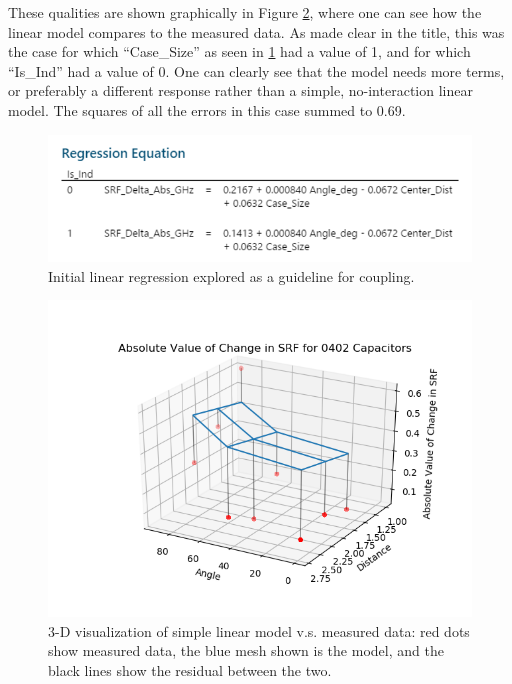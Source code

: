 \documentclass[12pt]{usfcoe}
\begin{document}
    These qualities are shown graphically in Figure \ref{fig:minitab_model_visualization}, where one can see how the linear model compares to the measured data.
    As made clear in the title, this was the case for which ``Case\_Size'' as seen in \ref{fig:minitab_linear_models} had a value of 1, and for which ``Is\_Ind'' had a value of 0. 
    One can clearly see that the model needs more terms, or preferably a different response rather than a simple, no-interaction linear model. 
    The squares of all the errors in this case summed to 0.69.

    \begin{figure}[H]
		\begin{center}
        	\includegraphics[width=\textwidth]{images/ANOVA/linear_models.png} 
			\caption{Initial linear regression explored as a guideline for coupling.}
			\label{fig:minitab_linear_models}
		\end{center}
    \end{figure}    
    
    \begin{figure}[H]
		\begin{center}
        	\includegraphics[width=\textwidth]{images/ANOVA/linear_model_surface.png} 
			\caption{3-D visualization of simple linear model v.s. measured data: red dots show measured data, the blue mesh shown is the model, and the black lines show the residual between the two. }
			\label{fig:minitab_model_visualization}
		\end{center}
    \end{figure}    
\end{document}
